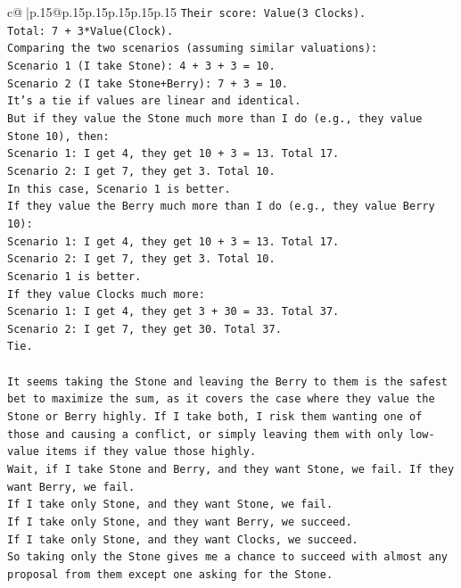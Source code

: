 \documentclass{article}
\begin{document}
{\begin{supertabular}{c@{$\;$}|p{.15\linewidth}@{}p{.15\linewidth}p{.15\linewidth}p{.15\linewidth}p{.15\linewidth}p{.15\linewidth}}
{{{\texttt{Their score: Value(3 Clocks).} \\
\texttt{Total: 7 + 3*Value(Clock).} \\
\texttt{Comparing the two scenarios (assuming similar valuations):} \\
\texttt{Scenario 1 (I take Stone): 4 + 3 + 3 = 10.} \\
\texttt{Scenario 2 (I take Stone+Berry): 7 + 3 = 10.} \\
\texttt{It's a tie if values are linear and identical.} \\
\texttt{But if they value the Stone much more than I do (e.g., they value Stone 10), then:} \\
\texttt{Scenario 1: I get 4, they get 10 + 3 = 13. Total 17.} \\
\texttt{Scenario 2: I get 7, they get 3. Total 10.} \\
\texttt{In this case, Scenario 1 is better.} \\
\texttt{If they value the Berry much more than I do (e.g., they value Berry 10):} \\
\texttt{Scenario 1: I get 4, they get 10 + 3 = 13. Total 17.} \\
\texttt{Scenario 2: I get 7, they get 3. Total 10.} \\
\texttt{Scenario 1 is better.} \\
\texttt{If they value Clocks much more:} \\
\texttt{Scenario 1: I get 4, they get 3 + 30 = 33. Total 37.} \\
\texttt{Scenario 2: I get 7, they get 30. Total 37.} \\
\texttt{Tie.} \\
\\ 
\texttt{It seems taking the Stone and leaving the Berry to them is the safest bet to maximize the sum, as it covers the case where they value the Stone or Berry highly. If I take both, I risk them wanting one of those and causing a conflict, or simply leaving them with only low{-}value items if they value those highly.} \\
\texttt{Wait, if I take Stone and Berry, and they want Stone, we fail. If they want Berry, we fail.} \\
\texttt{If I take only Stone, and they want Stone, we fail.} \\
\texttt{If I take only Stone, and they want Berry, we succeed.} \\
\texttt{If I take only Stone, and they want Clocks, we succeed.} \\
\texttt{So taking only the Stone gives me a chance to succeed with almost any proposal from them except one asking for the Stone.} \\
}}}
\end{supertabular}}
\end{document}
